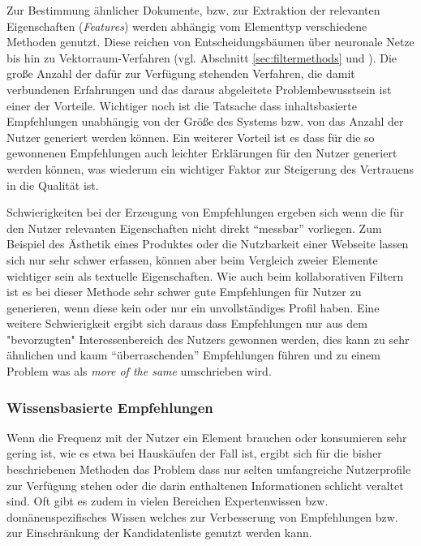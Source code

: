 Zur Bestimmung ähnlicher Dokumente, bzw. zur Extraktion der relevanten Eigenschaften (\textit{Features}) werden abhängig vom Elementtyp verschiedene Methoden genutzt. Diese reichen von Entscheidungsbäumen über neuronale Netze bis hin zu Vektorraum-Verfahren (vgl. Abschnitt \ref{sec:filtermethods} und \citep[Kap. 3]{rs}). Die große Anzahl der dafür zur Verfügung stehenden Verfahren, die damit verbundenen Erfahrungen und das daraus abgeleitete Problembewusstsein ist einer der Vorteile. Wichtiger noch ist die Tatsache dass inhaltsbasierte Empfehlungen unabhängig von der Größe des Systems bzw. von das Anzahl der Nutzer generiert werden können. Ein weiterer Vorteil ist es dass für die so gewonnenen Empfehlungen auch leichter Erklärungen für den Nutzer generiert werden können, was wiederum ein wichtiger Faktor zur Steigerung des Vertrauens in die Qualität ist.

Schwierigkeiten bei der Erzeugung von Empfehlungen ergeben sich wenn die für den Nutzer relevanten Eigenschaften nicht direkt ``messbar'' vorliegen. Zum Beispiel des Ästhetik eines Produktes oder die Nutzbarkeit einer Webseite lassen sich nur sehr schwer erfassen, können aber beim Vergleich zweier Elemente wichtiger sein als textuelle Eigenschaften. Wie auch beim kollaborativen Filtern ist es bei dieser Methode sehr schwer gute Empfehlungen für Nutzer zu generieren, wenn diese kein oder nur ein unvollständiges Profil haben. Eine weitere Schwierigkeit ergibt sich daraus dass Empfehlungen nur aus dem "bevorzugten" Interessenbereich des Nutzers gewonnen werden, dies kann zu sehr ähnlichen und kaum ``überraschenden'' Empfehlungen führen und zu einem Problem was als \textit{more of the same} umschrieben wird.  \citep[Kap. 3]{rs} \citep{hb_03}


\subsubsection{Wissensbasierte Empfehlungen}

Wenn die Frequenz mit der Nutzer ein Element brauchen oder konsumieren sehr gering ist, wie es etwa bei Hauskäufen der Fall ist, ergibt sich für die bisher beschriebenen Methoden das Problem dass nur selten umfangreiche Nutzerprofile zur Verfügung stehen oder die darin enthaltenen Informationen schlicht veraltet sind. Oft gibt es zudem in vielen Bereichen Expertenwissen bzw. domänenspezifisches Wissen welches zur Verbesserung von Empfehlungen bzw. zur Einschränkung der Kandidatenliste genutzt werden kann.

